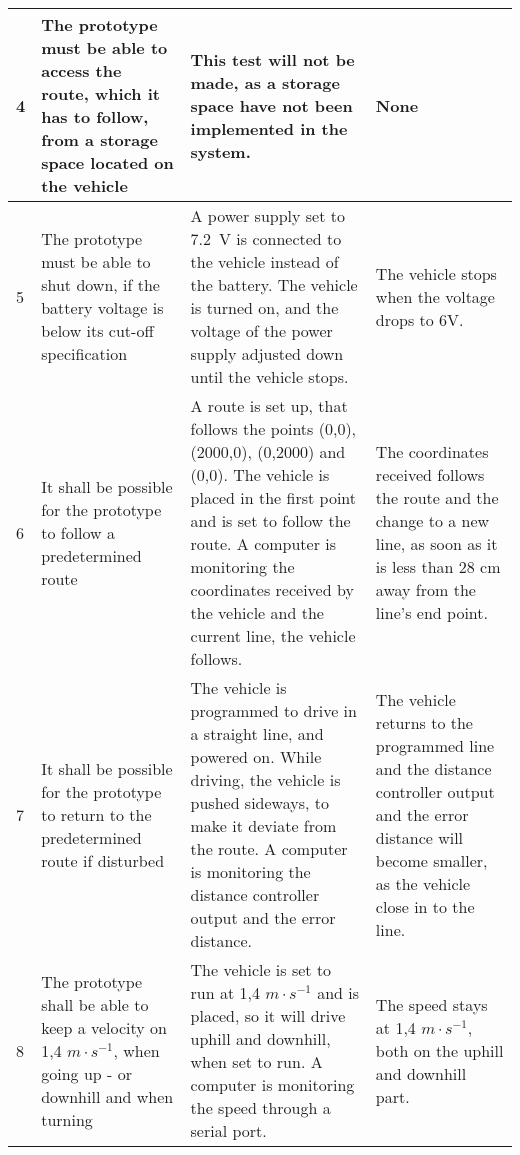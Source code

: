\begin{table}[H]
\begin{tabular}{|p{2cm}|p{5cm}|p{6cm}|p{3cm}|}
\hline%
           4    &   The prototype must be able to access the route, which it has to follow, from a storage space located on the vehicle & This test will not be made, as a storage space have not been implemented in the system.   & None                 \\
\hline%
           5    &   The prototype must be able to shut down, if the battery voltage is below its cut-off specification &   A power supply set to \SI{7,2}{V} is connected to the vehicle instead of the battery. The vehicle is turned on, and the voltage of the power supply adjusted down until the vehicle stops.   &   The vehicle stops when the voltage drops to 6V.               \\
\hline%
           6    &   It shall be possible for the prototype to follow a predetermined route &   A route is set up, that follows the points (0,0), (2000,0), (0,2000) and (0,0). The vehicle is placed in the first point and is set to follow the route. A computer is monitoring the coordinates received by the vehicle and the current line, the vehicle follows.  &  The coordinates received follows the route and the change to a new line, as soon as it is less than 28 cm away from the line's end point. \\
\hline%
           7    &   It shall be possible for the prototype to return to the predetermined route if disturbed   &  The vehicle is programmed to drive in a straight line, and powered on. While driving, the vehicle is pushed sideways, to make it deviate from the route. A computer is monitoring the distance controller output and the error distance.    &   The vehicle returns to the programmed line and the distance controller output and the error distance will become smaller, as the vehicle close in to the line.            \\ 
\hline%
           8    &   The prototype shall be able to keep a velocity on 1,4 $m \cdot s^{-1}$, when going up - or downhill and when turning   &  The vehicle is set to run at 1,4 $m \cdot s^{-1}$ and is placed, so it will drive uphill and downhill, when set to run. A computer is monitoring the speed through a serial port.   &    The speed stays at 1,4 $m \cdot s^{-1}$, both on the uphill and downhill part.            \\
\hline%
\end{tabular}
\label{tab:AcceptTestTestProcedure}
\end{table}

